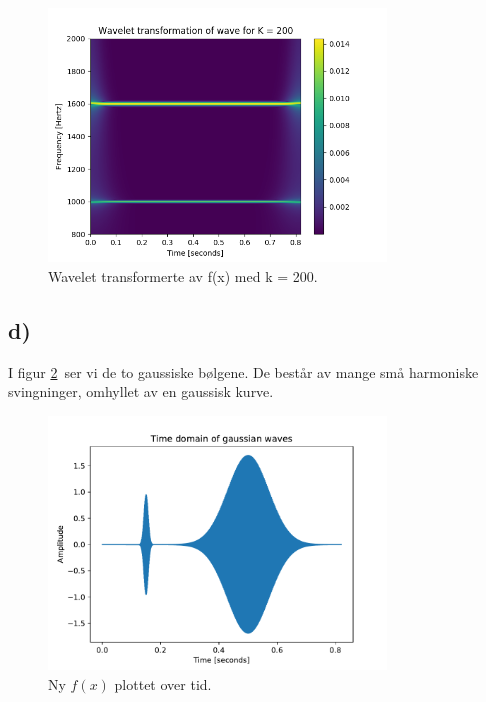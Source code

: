 \documentclass[11pt,norsk]{article}
\begin{document}
\begin{figure}[H]
\centering
\includegraphics[width=0.8\textwidth]{fig/wavelet_sinus_k=200.png}
\caption{Wavelet transformerte av f(x) med k = 200.}
\label{fig:wl_sinus_wave2}
\end{figure}


\subsection*{d)}
I figur \ref{fig:gaussian_wave} ser vi de to gaussiske bølgene. De består av mange små harmoniske svingninger, omhyllet av en gaussisk kurve.
\begin{figure}[H]
\centering
\includegraphics[width=0.8\textwidth]{fig/gaussian_wave.pdf}
\caption{Ny $f(x)$ plottet over tid.}
\label{fig:gaussian_wave}
\end{figure}
\end{document}
